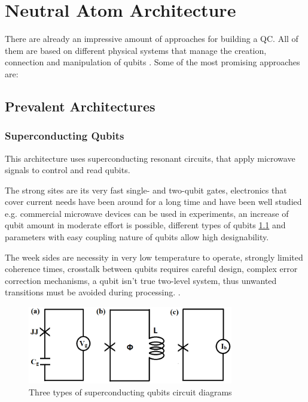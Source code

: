 
\chapter{Neutral Atom Architecture}\label{chapter:neutralatom}
There are already an impressive amount of approaches for building a \ac{QC}.
All of them are based on different physical systems that manage the creation, connection and manipulation of qubits \parencite{Wintersperger_2023}.
Some of the most promising approaches are:
\section{Prevalent Architectures}
\subsection{Superconducting Qubits}
This architecture uses superconducting resonant circuits, that apply microwave signals to control and read qubits. 

The strong sites are its very fast single- and two-qubit gates,
electronics that cover current needs have been around for a long time and have been well studied 
e.g. commercial microwave devices can be used in experiments,
an increase of qubit amount in moderate effort is possible, 
different types of qubits \ref{fig:superconducting} and parameters with easy coupling nature of qubits allow high designability.

The week sides are necessity in very low temperature to operate, strongly limited coherence times, 
crosstalk between qubits requires careful design, complex error correction mechanisms,
a qubit isn't true two-level system, thus unwanted transitions must be avoided during processing. 
\parencite{Huang_2020}.
\begin{figure}[htbp]
  \centering
    \includegraphics[width=0.8\textwidth]{figures/Superconducting.png}
    \caption{Three types of superconducting qubits circuit diagrams \parencite{Huang_2020}}
    \label{fig:superconducting}
\end{figure}

